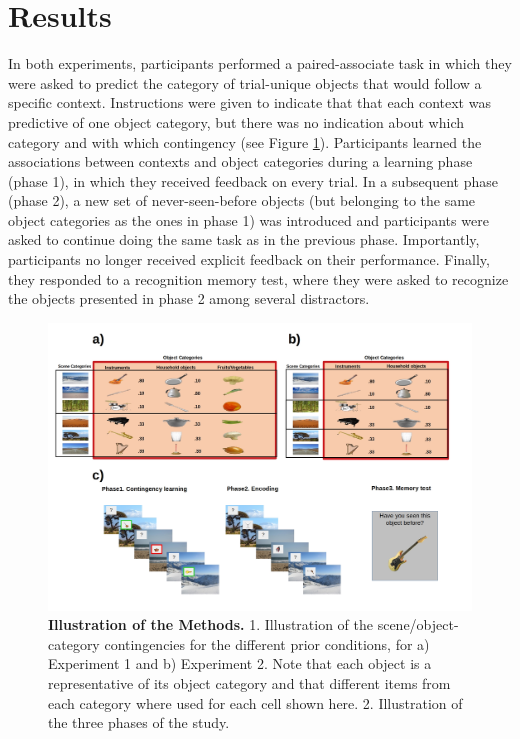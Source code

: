 \documentclass[a4paper,12pt]{article} 			%
\begin{document}

\section{Results}
In both experiments, participants performed a paired-associate task in which they were asked to predict the category of trial-unique objects that would follow a specific context. Instructions were given to indicate that that each context was predictive of one object category, but there was no indication about which category and with which contingency (see Figure \ref{fig:Methods}). Participants learned the associations between contexts and object categories during a learning phase (phase 1), in which they received feedback on every trial. In a subsequent phase (phase 2), a new set of never-seen-before objects (but belonging to the same object categories as the ones in phase 1) was introduced and participants were asked to continue doing the same task as in the previous phase. Importantly, participants no longer received explicit feedback on their performance. Finally, they responded to a recognition memory test, where they were asked to recognize the objects presented in phase 2 among several distractors.

\begin{figure}[ht!]
\centerline
{\includegraphics[width=1.5\textwidth]{figures/methods.All.jpg}}
\caption{\textbf{Illustration of the Methods.} 1. Illustration of the scene/object-category contingencies for the different prior conditions, for a) Experiment 1 and b) Experiment 2. Note that each object is a representative of its object category and that different items from each category where used for each cell shown here. 2. Illustration of the three phases of the study. }
\label{fig:Methods}
\end{figure}
\end{document}

